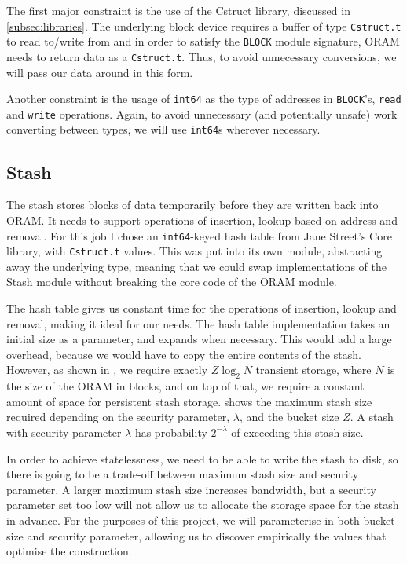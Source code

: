 \documentclass[12pt,a4paper,twoside,openright]{report}
\begin{document}
The first major constraint is the use of the Cstruct library, discussed in \cref{subsec:libraries}. The underlying block device requires a buffer of type \texttt{Cstruct.t} to read to/write from and in order to satisfy the \texttt{BLOCK} module signature, ORAM needs to return data as a \texttt{Cstruct.t}. Thus, to avoid unnecessary conversions, we will pass our data around in this form.

Another constraint is the usage of \texttt{int64} as the type of addresses in \texttt{BLOCK}'s, \texttt{read} and \texttt{write} operations. Again, to avoid unnecessary (and potentially unsafe) work converting between types, we will use \texttt{int64}s wherever necessary.

\subsection{Stash}

The stash stores blocks of data temporarily before they are written back into ORAM. It needs to support operations of insertion, lookup based on address and removal. For this job I chose an \texttt{int64}-keyed hash table from Jane Street's Core library, with \texttt{Cstruct.t} values. This was put into its own module, abstracting away the underlying type, meaning that we could swap implementations of the Stash module without breaking the core code of the ORAM module.

The hash table gives us constant time for the operations of insertion, lookup and removal, making it ideal for our needs. The hash table implementation takes an initial size as a parameter, and expands when necessary. This would add a large overhead, because we would have to copy the entire contents of the stash. However, as shown in \cite{stefanov2013path}, we require exactly $Z\log_2N$ transient storage, where $N$ is the size of the ORAM in blocks, and on top of that, we require a constant amount of space for persistent stash storage.  shows the maximum stash size required depending on the security parameter, $\lambda$, and the bucket size $Z$. A stash with security parameter $\lambda$ has probability $2^{-\lambda}$ of exceeding this stash size.

In order to achieve statelessness, we need to be able to write the stash to disk, so there is going to be a trade-off between maximum stash size and security parameter. A larger maximum stash size increases bandwidth, but a security parameter set too low will not allow us to allocate the storage space for the stash in advance. For the purposes of this project, we will parameterise in both bucket size and security parameter, allowing us to discover empirically the values that optimise the construction.
\end{document}
